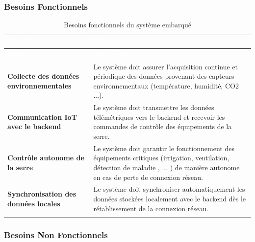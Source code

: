 \subsubsection{Besoins Fonctionnels}

{\small
	\renewcommand{\arraystretch}{1.5}
	\begin{longtable}{|p{4cm}|p{9cm}|}

		\hline
		\rowcolor[HTML]{2C3E50}
		\textcolor{white}{\textbf{Besoin}} &
		\textcolor{white}{\textbf{Description}}
		\\ \hline
		\endfirsthead

		\hline
		\rowcolor[HTML]{2C3E50}
		\textcolor{white}{\textbf{Besoin}} &
		\textcolor{white}{\textbf{Description}}
		\\ \hline
		\endhead

		\rowcolor[HTML]{EFEFEF}
		\textbf{Collecte des données environnementales} &
		Le système doit assurer l’acquisition continue et périodique des données provenant des capteurs environnementaux (température, humidité, CO2 ...). 
		\\ \hline
		
		\textbf{Communication IoT avec le backend} &
		Le système doit transmettre les données télémétriques vers le backend et recevoir les commandes de contrôle des équipements de la serre. 
		\\ \hline
		
		\rowcolor[HTML]{EFEFEF}
		\textbf{Contrôle autonome de la serre} &
		Le système doit garantir le fonctionnement des équipements critiques (irrigation, ventilation, détection de maladie , ... ) de manière autonome en cas de perte de connexion réseau. 
		\\ \hline
		
		\textbf{Synchronisation des données locales} &
		Le système doit synchroniser automatiquement les données stockées localement avec le backend dès le rétablissement de la connexion réseau. 
		\\ \hline
		
		\caption{Besoins fonctionnels du système embarqué}
		\label{tab:bf-embedded}
		
	\end{longtable}
}
\subsubsection{Besoins Non Fonctionnels}

\renewcommand{\arraystretch}{1.5}

